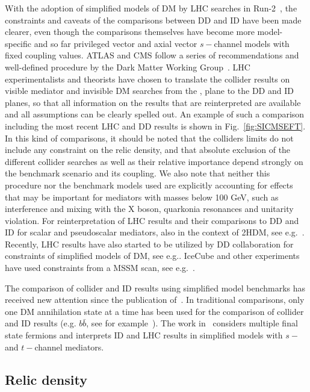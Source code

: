 With the adoption of simplified models of DM by LHC searches in Run-2~\cite{Abercrombie:2015wmb}, the
constraints and caveats of the comparisons between DD and ID have been made clearer, even though the comparisons themselves have become more model-specific and so far privileged vector and axial vector $s-$channel models with fixed coupling values. ATLAS and CMS follow a series of recommendations and well-defined procedure by the Dark Matter Working Group~\cite{Boveia:2016mrp}. LHC experimentalists and theorists have chosen to translate the collider results on visible mediator and invisible DM searches from the \mdm, \mmed plane to the DD and ID planes, so that all information on the results that are reinterpreted are available and all assumptions can be clearly spelled out. An example of such a comparison including the most recent LHC and DD results is shown in Fig.~\ref{fig:SICMSEFT}. In this kind of comparisons, it should be noted that the colliders limits do not include any constraint on the relic density, and that absolute exclusion of the different collider searches as well as their relative importance depend strongly on the benchmark scenario and its coupling. We also note that neither this procedure nor the benchmark models used are explicitly accounting for effects that may be important for mediators with masses below 100 GeV, such as interference and mixing with the X boson, quarkonia resonances and unitarity violation. 
For reinterpretation of LHC results and their comparisons to DD and ID for scalar and pseudoscalar mediators, also in the context of 2HDM, see e.g.~\cite{Athron:2017kgt,Banerjee:2017wxi,Ipek:2014gua,Bell:2016ekl}.
Recently, LHC results have also started to be utilized by DD collaboration for constraints of simplified models of DM, see e.g.\cite{PhysRevLett.118.251301,Balazs:2017hxh}. IceCube and other experiments have used constraints from a MSSM scan, see e.g.~\cite{Aartsen:2016zhm}.

The comparison of collider and ID results using simplified model benchmarks has received new attention since the publication of~\cite{Boveia:2016mrp}. In traditional comparisons, only one DM annihilation state at a time has been used for the comparison of collider and ID results (e.g. $b\bar{b}$, see for example~\cite{Agrawal:2014una}). The work in~\cite{Carpenter:2016thc} considers multiple final state fermions and interprets ID and LHC results in simplified models with $s-$ and $t-$channel mediators. 


\subsection{Relic density}

